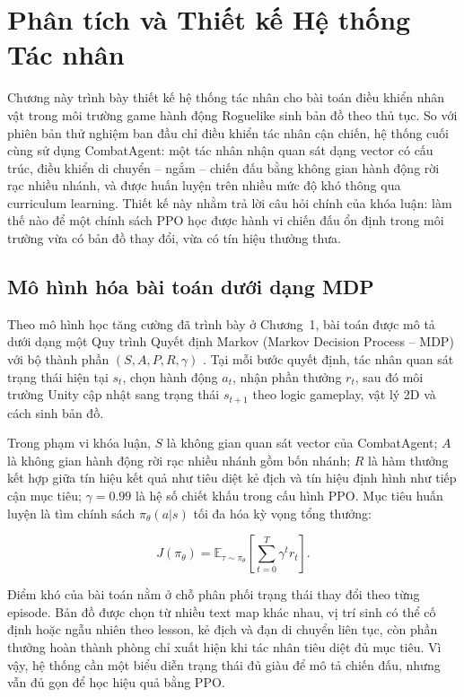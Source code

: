 \setcounter{secnumdepth}{3}

\setcounter{chapter}{1}
\chapter[{PHÂN TÍCH VÀ THIẾT KẾ HỆ THỐNG TÁC NHÂN}]{Phân tích và Thiết kế Hệ thống Tác nhân}

Chương này trình bày thiết kế hệ thống tác nhân cho bài toán điều khiển nhân vật trong môi trường game hành động Roguelike sinh bản đồ theo thủ tục. So với phiên bản thử nghiệm ban đầu chỉ điều khiển tác nhân cận chiến, hệ thống cuối cùng sử dụng CombatAgent: một tác nhân nhận quan sát dạng vector có cấu trúc, điều khiển di chuyển -- ngắm -- chiến đấu bằng không gian hành động rời rạc nhiều nhánh, và được huấn luyện trên nhiều mức độ khó thông qua curriculum learning. Thiết kế này nhằm trả lời câu hỏi chính của khóa luận: làm thế nào để một chính sách PPO học được hành vi chiến đấu ổn định trong môi trường vừa có bản đồ thay đổi, vừa có tín hiệu thưởng thưa.

\section{Mô hình hóa bài toán dưới dạng MDP}

Theo mô hình học tăng cường đã trình bày ở Chương~1, bài toán được mô tả dưới dạng một Quy trình Quyết định Markov (Markov Decision Process -- MDP) với bộ thành phần $(S,A,P,R,\gamma)$ \cite{Schulman2017}. Tại mỗi bước quyết định, tác nhân quan sát trạng thái hiện tại $s_t$, chọn hành động $a_t$, nhận phần thưởng $r_t$, sau đó môi trường Unity cập nhật sang trạng thái $s_{t+1}$ theo logic gameplay, vật lý 2D và cách sinh bản đồ.

Trong phạm vi khóa luận, $S$ là không gian quan sát vector của CombatAgent; $A$ là không gian hành động rời rạc nhiều nhánh gồm bốn nhánh; $R$ là hàm thưởng kết hợp giữa tín hiệu kết quả như tiêu diệt kẻ địch và tín hiệu định hình như tiếp cận mục tiêu; $\gamma=0.99$ là hệ số chiết khấu trong cấu hình PPO. Mục tiêu huấn luyện là tìm chính sách $\pi_{\theta}(a|s)$ tối đa hóa kỳ vọng tổng thưởng:

\begin{equation}
    J(\pi_\theta) = \mathbb{E}_{\tau \sim \pi_\theta}
    \left[\sum_{t=0}^{T}\gamma^t r_t\right].
\end{equation}

Điểm khó của bài toán nằm ở chỗ phân phối trạng thái thay đổi theo từng episode. Bản đồ được chọn từ nhiều text map khác nhau, vị trí sinh có thể cố định hoặc ngẫu nhiên theo lesson, kẻ địch và đạn di chuyển liên tục, còn phần thưởng hoàn thành phòng chỉ xuất hiện khi tác nhân tiêu diệt đủ mục tiêu. Vì vậy, hệ thống cần một biểu diễn trạng thái đủ giàu để mô tả chiến đấu, nhưng vẫn đủ gọn để học hiệu quả bằng PPO.

